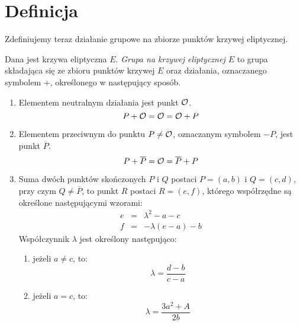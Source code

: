 \section{Definicja}

Zdefiniujemy teraz działanie grupowe na zbiorze punktów krzywej eliptycznej.

\begin{definition}\label{ec_groupop_def}
Dana jest krzywa eliptyczna $E$.
\emph{Grupa na krzywej eliptycznej $E$}
to grupa składająca się
ze zbioru punktów krzywej $E$
oraz działania, oznaczanego symbolem $+$,
określonego w następujący sposób.
\begin{enumerate}
\item\label{ec_groupop_neutral}
Elementem neutralnym działania jest punkt $\mathcal{O}$.
\begin{equation}
P + \mathcal{O} = \mathcal{O} = \mathcal{O} + P
\end{equation}
\item\label{ec_groupop_inverse}
Elementem przeciwnym do punktu $P \neq \mathcal{O}$,
oznaczanym symbolem $-P$,
jest punkt $\overline{P}$.
\begin{equation}
P + \overline{P} = \mathcal{O} = \overline{P} + P
\end{equation}
\item\label{ec_groupop_add_generic}
Suma dwóch punktów skończonych $P$ i $Q$
postaci $P = (a, b)$ i $Q = (c, d)$,
przy czym $Q \neq \overline{P}$,
to punkt $R$ postaci $R = (e, f)$,
którego współrzędne są określone następującymi wzorami:
\begin{eqnarray}
\label{ec_groupop_add_generic_eqn_x}
e & = & \lambda^2 - a - c \\
\label{ec_groupop_add_generic_eqn_y}
f & = & -\lambda(e - a) - b
\end{eqnarray}
Współczynnik $\lambda$ jest określony następująco:
\begin{enumerate}
\item\label{ec_groupop_add_generic_chord}
jeżeli $a \neq c$, to:
\begin{equation}\label{ec_groupop_add_generic_lambda_chord_eqn}
\lambda = \frac{d-b}{c-a}
\end{equation}
\item\label{ec_groupop_add_generic_tangent}
jeżeli $a = c$, to:
\begin{equation}\label{ec_groupop_add_generic_lambda_tangent_eqn}
\lambda = \frac{3a^2+A}{2b}
\end{equation}
\end{enumerate}
\end{enumerate}
\end{definition}

